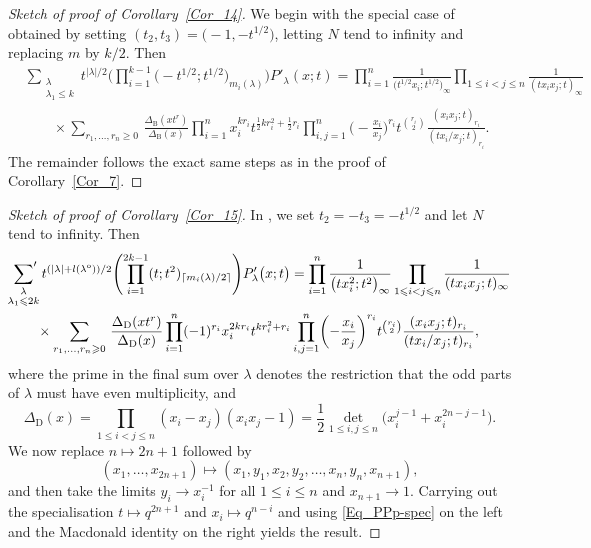 \documentclass[pdftex]{sigma}
\numberwithin{equation}{section}
\renewcommand{\leq}{\leqslant}
\renewcommand{\geq}{\geqslant}
\newcommand{\ceil}[1]{\lceil#1\rceil}
\newcommand{\abs}[1]{\vert#1\vert}
\newcommand{\la}{\lambda}
\begin{document}
\begin{proof}[Sketch of proof of Corollary~\ref{Cor_14}]
We begin with the special case of \cite[Proposition~5.10]{RW21} obtained
by setting $(t_2,t_3)=\bigl(-1,-t^{1/2}\bigr)$, letting $N$ tend to infinity
and replacing $m$ by $k/2$.
Then
\begin{align*}
&\sum_{\substack{\la \\[1pt] \la_1\leq k}}
t^{\abs{\la}/2}
\Biggl(\prod_{i=1}^{k-1} \bigl(-t^{1/2};t^{1/2}\bigr)_{m_i(\la)}\Biggr)P'_{\la}(x;t)
=\prod_{i=1}^n \frac{1}{\bigl(t^{1/2}x_i;t^{1/2}\bigr)_{\infty}}
\prod_{1\leq i<j\leq n} \frac{1}{(tx_ix_j;t)_{\infty}} \\
&\qquad\times \sum_{r_1,\dots,r_n\geq 0}\,
\frac{\Delta_{\mathrm{B}}(xt^r)}{\Delta_{\mathrm{B}}(x)}
\prod_{i=1}^n x_i^{kr_i} t^{\frac{1}{2}kr_i^2+\frac{1}{2}r_i}
\prod_{i,j=1}^n \biggl({-}\frac{x_i}{x_j}\biggr)^{r_i} t^{\binom{r_i}{2}}
\frac{(x_ix_j;t)_{r_i}}{(tx_i/x_j;t)_{r_i}}.
\end{align*}
The remainder follows the exact same steps as in the proof of
Corollary~\ref{Cor_7}.
\end{proof}

\begin{proof}[Sketch of proof of Corollary~\ref{Cor_15}]
In \cite[Proposition~5.10]{RW21}, we set $t_2=-t_3=-t^{1/2}$ and
let $N$ tend to infinity.
Then
\begin{align}
&\sideset{}{'}\sum_{\substack{\la \\[1pt] \la_1\leq 2k}}
t^{(\abs{\la}+l(\la^{\textup{o}}))/2}
\Biggl(\prod_{i=1}^{2k-1}(t;t^2)_{\ceil{m_i(\la)/2}}\Biggr)
P'_{\la}\bigl(x;t\bigr)
=\prod_{i=1}^n \frac{1}{\bigl(tx_i^2;t^2\bigr)_{\infty}}
\prod_{1\leq i<j\leq n} \frac{1}{(tx_ix_j;t)_{\infty}} \notag \\
&\qquad\times \sum_{r_1,\dots,r_n\geq 0}\,
\frac{\Delta_{\mathrm{D}}(xt^r)}{\Delta_{\mathrm{D}}(x)}
\prod_{i=1}^n (-1)^{r_i} x_i^{2kr_i} t^{kr_i^2+r_i}
\prod_{i,j=1}^n \biggl({-}\frac{x_i}{x_j}\biggr)^{r_i} t^{\binom{r_i}{2}}
\frac{(x_ix_j;t)_{r_i}}{(tx_i/x_j;t)_{r_i}}, \label{Eq_RWc}
\end{align}
where the prime in the final sum over $\la$ denotes the
restriction that the odd parts of $\la$ must have even multiplicity,
and
\[
\Delta_{\mathrm{D}}(x)=\prod_{1\leq i<j\leq n}(x_i-x_j)(x_ix_j-1)
=\frac{1}{2}\det_{1\leq i,j\leq n}\bigl(x_i^{j-1}+x_i^{2n-j-1}\bigr).
\]
We now replace $n\mapsto 2n+1$ followed by
\[
(x_1,\dots,x_{2n+1})\mapsto
(x_1,y_1,x_2,y_2,\dots,x_n,y_n,x_{n+1}),
\]
and then take the limits $y_i\to x_i^{-1}$ for all $1\leq i\leq n$
and $x_{n+1}\to 1$.
Carrying out the specialisation $t\mapsto q^{2n+1}$ and
$x_i\mapsto q^{n-i}$ and using \eqref{Eq_PPp-spec} on the left and
the  Macdonald identity on the right
yields the result.
\end{proof}
\end{document}
